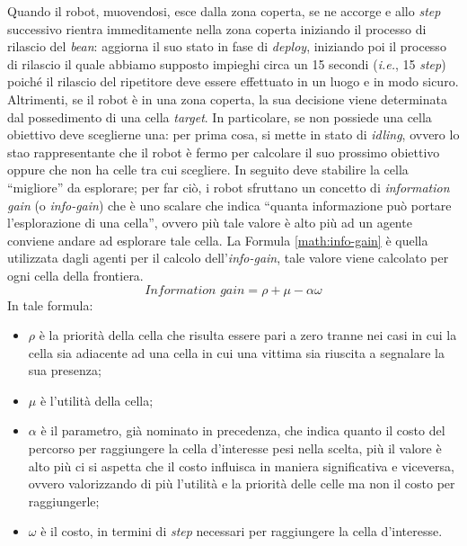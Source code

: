 Quando il robot, muovendosi, esce dalla zona coperta, se ne accorge e allo \textit{step} successivo rientra immeditamente nella zona coperta iniziando il processo di rilascio del \textit{bean}: aggiorna il suo stato in fase di \textit{deploy}, iniziando poi il processo di rilascio il quale abbiamo supposto impieghi circa un 15 secondi (\textit{i.e.}, 15 \textit{step}) poiché il rilascio del ripetitore deve essere effettuato in un luogo e in modo sicuro.\\
Altrimenti, se il robot è in una zona coperta, la sua decisione viene determinata dal possedimento di una cella \textit{target}.
In particolare, se non possiede una cella obiettivo deve sceglierne una: per prima cosa, si mette in stato di \textit{idling}, ovvero lo stao rappresentante che il robot è fermo per calcolare il suo prossimo obiettivo oppure che non ha celle tra cui scegliere.
In seguito deve stabilire la cella “migliore” da esplorare; per far ciò, i robot sfruttano un concetto di \textit{information gain} (o \textit{info-gain})  che è uno scalare che indica “quanta informazione può portare l'esplorazione di una cella”, ovvero più tale valore è alto più ad un agente conviene andare ad esplorare tale cella.
La Formula \ref{math:info-gain} è quella utilizzata dagli agenti per il calcolo dell'\textit{info-gain}, tale valore viene calcolato per ogni cella della frontiera.
\begin{equation}
	\label{math:info-gain}
	\textit{Information gain} = \rho+\mu-\alpha\omega
\end{equation}
In tale formula:
\begin{itemize}
	\item $\rho$ è la priorità della cella che risulta essere pari a zero tranne nei casi in cui la cella sia adiacente ad una cella in cui una vittima sia riuscita a segnalare la sua presenza;
	\item $\mu$ è l'utilità della cella;
	\item $\alpha$ è il parametro, già nominato in precedenza, che indica quanto il costo del percorso per raggiungere la cella d'interesse pesi nella scelta, più il valore è alto più ci si aspetta che il costo influisca in maniera significativa e viceversa, ovvero valorizzando di più l'utilità e la priorità delle celle ma non il costo per raggiungerle;
	\item $\omega$ è il costo, in termini di \textit{step} necessari per raggiungere la cella d'interesse.
\end{itemize}
